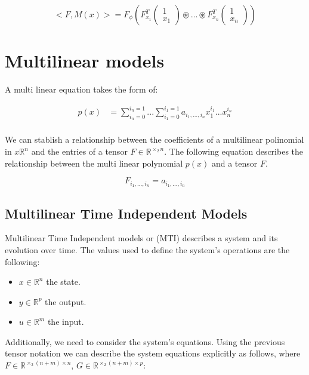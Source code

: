 \documentclass{article}
\begin{document}
\begin{equation}
    <F, M(x)> = F_{\phi}(F_{x_1}^T 
    \begin{pmatrix}
        1 \\
        x_1    
    \end{pmatrix}
    \circledast
    \dots
    \circledast
    F_{x_n}^T
    \begin{pmatrix}
        1 \\
        x_n    
    \end{pmatrix})
\end{equation}

\section{Multilinear models}

A multi linear equation takes the form of:

\begin{align}
    p(x) &= \sum_{i_n = 0}^{i_n = 1}...\sum_{i_1 = 0}^{i_1 = 1} a_{i_1, ..., i_n} x_1^{i_1}...x_n^{i_n} \\ 
\end{align}

We can stablish a relationship between the coefficients of a multilinear polinomial in $x\mathbb{R}^{n}$ 
and the entries of a tensor $F \in \mathbb{R}^{\times_2 n}$. The following equation describes the relationship between
the multi linear polynomial $p(x)$ and a tensor $F$.

\begin{equation}
    F_{i_1,...,i_n} = a_{i_1, ..., i_n}
\end{equation}

\subsection{Multilinear Time Independent Models}

Multilinear Time Independent models or (MTI) describes a system and its evolution over time. 
The values used to define the system's operations are the following:

\begin{itemize}
    \item $x \in\mathbb{R}^n$ the state.   
    \item $y \in\mathbb{R}^p$ the output.   
    \item $u \in\mathbb{R}^m$ the input.   
\end{itemize}

Additionally, we need to consider the system's equations. 
Using the previous tensor notation we can describe the system equations explicitly as follows,
where $F \in \mathbb{R}^{\times_2 (n+m) \times n}$, $G \in \mathbb{R}^{\times_2 (n+m) \times p}$:
\end{document}
